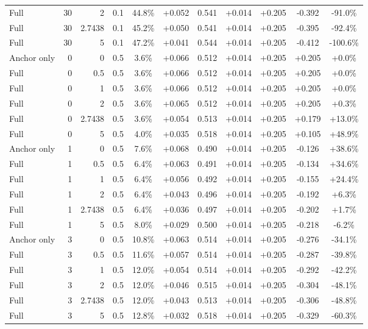 \begin{table}[htbp]
\begin{tabular}{lrrrccccccc}
Full & 30 & 2 & 0.1 & 44.8\% & +0.052 & 0.541 & +0.014 & +0.205 & -0.392 & -91.0\% \\
Full & 30 & 2.7438 & 0.1 & 45.2\% & +0.050 & 0.541 & +0.014 & +0.205 & -0.395 & -92.4\% \\
Full & 30 & 5 & 0.1 & 47.2\% & +0.041 & 0.544 & +0.014 & +0.205 & -0.412 & -100.6\% \\
Anchor only & 0 & 0 & 0.5 & 3.6\% & +0.066 & 0.512 & +0.014 & +0.205 & +0.205 & +0.0\% \\
Full & 0 & 0.5 & 0.5 & 3.6\% & +0.066 & 0.512 & +0.014 & +0.205 & +0.205 & +0.0\% \\
Full & 0 & 1 & 0.5 & 3.6\% & +0.066 & 0.512 & +0.014 & +0.205 & +0.205 & +0.0\% \\
Full & 0 & 2 & 0.5 & 3.6\% & +0.065 & 0.512 & +0.014 & +0.205 & +0.205 & +0.3\% \\
Full & 0 & 2.7438 & 0.5 & 3.6\% & +0.054 & 0.513 & +0.014 & +0.205 & +0.179 & +13.0\% \\
Full & 0 & 5 & 0.5 & 4.0\% & +0.035 & 0.518 & +0.014 & +0.205 & +0.105 & +48.9\% \\
Anchor only & 1 & 0 & 0.5 & 7.6\% & +0.068 & 0.490 & +0.014 & +0.205 & -0.126 & +38.6\% \\
Full & 1 & 0.5 & 0.5 & 6.4\% & +0.063 & 0.491 & +0.014 & +0.205 & -0.134 & +34.6\% \\
Full & 1 & 1 & 0.5 & 6.4\% & +0.056 & 0.492 & +0.014 & +0.205 & -0.155 & +24.4\% \\
Full & 1 & 2 & 0.5 & 6.4\% & +0.043 & 0.496 & +0.014 & +0.205 & -0.192 & +6.3\% \\
Full & 1 & 2.7438 & 0.5 & 6.4\% & +0.036 & 0.497 & +0.014 & +0.205 & -0.202 & +1.7\% \\
Full & 1 & 5 & 0.5 & 8.0\% & +0.029 & 0.500 & +0.014 & +0.205 & -0.218 & -6.2\% \\
Anchor only & 3 & 0 & 0.5 & 10.8\% & +0.063 & 0.514 & +0.014 & +0.205 & -0.276 & -34.1\% \\
Full & 3 & 0.5 & 0.5 & 11.6\% & +0.057 & 0.514 & +0.014 & +0.205 & -0.287 & -39.8\% \\
Full & 3 & 1 & 0.5 & 12.0\% & +0.054 & 0.514 & +0.014 & +0.205 & -0.292 & -42.2\% \\
Full & 3 & 2 & 0.5 & 12.0\% & +0.046 & 0.515 & +0.014 & +0.205 & -0.304 & -48.1\% \\
Full & 3 & 2.7438 & 0.5 & 12.0\% & +0.043 & 0.513 & +0.014 & +0.205 & -0.306 & -48.8\% \\
Full & 3 & 5 & 0.5 & 12.8\% & +0.032 & 0.518 & +0.014 & +0.205 & -0.329 & -60.3\% \\

\end{tabular}
\end{table}
